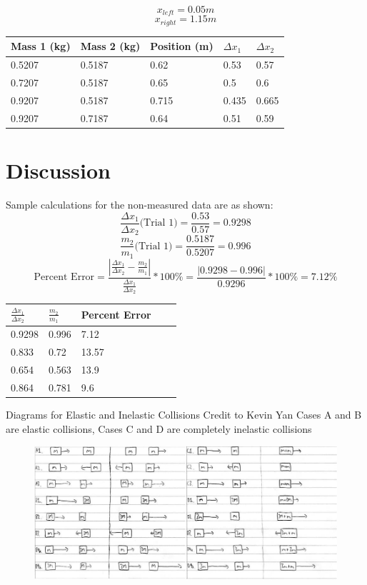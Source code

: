 \documentclass[11pt, titlepage]{article}
\begin{document}
\begin{center}
$$x_{left} = 0.05 m$$
$$x_{right} = 1.15 m$$
\begin{tabular}
{|m{7em}|m{7em}|m{7em}|m{7em}|m{7em}|}
\hline
Mass 1 (kg) & Mass 2 (kg) & Position (m) & $\Delta x_1$ & $\Delta x_2$ \\
\hline
0.5207 & 0.5187 & 0.62 & 0.53 & 0.57\\
\hline
0.7207 & 0.5187 & 0.65 & 0.5 & 0.6\\
\hline
0.9207 & 0.5187 & 0.715 & 0.435 & 0.665\\ 
\hline
0.9207 & 0.7187 & 0.64 & 0.51 & 0.59\\
\hline
\end{tabular}
\end{center}

\section*{Discussion}
Sample calculations for the non-measured data are as shown:
$$\frac{\Delta x_1}{\Delta x_2} \text{(Trial 1)} = \frac{0.53}{0.57} = 0.9298$$
$$\frac{m_2}{m_1} \text{(Trial 1)} = \frac{0.5187}{0.5207} = 0.996$$
$$\text{Percent Error} = \frac{|\frac{\Delta x_1}{\Delta x_2} - \frac{m_2}{m_1}|}{\frac{\Delta x_1}{\Delta x_2}} * 100\% = \frac{|0.9298 - 0.996|}{0.9296} * 100\% = 7.12\%$$

\begin{center}
\begin{tabular}
{|m{7em}|m{7em}|m{7em}|m{7em}|m{7em}|}
\hline
$\frac{\Delta x_1}{\Delta x_2}$ & $\frac{m_2}{m_1}$ & Percent Error \\
\hline
0.9298 & 0.996 & 7.12 \\
\hline
0.833 & 0.72 & 13.57 \\
\hline
0.654 & 0.563 & 13.9 \\
\hline
0.864 & 0.781 & 9.6 \\
\hline
\end{tabular}
\end{center}

Diagrams for Elastic and Inelastic Collisions
Credit to Kevin Yan
Cases A and B are elastic collisions, Cases C and D are completely inelastic collisions
\begin{figure}[p]
\centering
\hspace*{-7cm}
\includegraphics[scale=1, angle=270]{diagram6.jpg}
\vspace*{19cm}
\end{figure}
\end{document}
